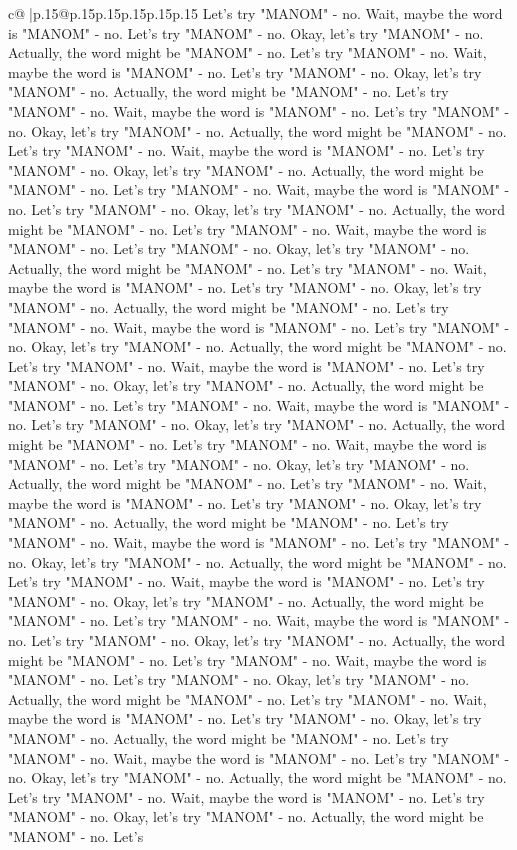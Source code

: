 \documentclass{article}
\begin{document}
{\begin{supertabular}{c@{$\;$}|p{.15\linewidth}@{}p{.15\linewidth}p{.15\linewidth}p{.15\linewidth}p{.15\linewidth}p{.15\linewidth}}
{{{Let's try "MANOM" {-} no. Wait, maybe the word is "MANOM" {-} no. Let's try "MANOM" {-} no. Okay, let's try "MANOM" {-} no. Actually, the word might be "MANOM" {-} no. Let's try "MANOM" {-} no. Wait, maybe the word is "MANOM" {-} no. Let's try "MANOM" {-} no. Okay, let's try "MANOM" {-} no. Actually, the word might be "MANOM" {-} no. Let's try "MANOM" {-} no. Wait, maybe the word is "MANOM" {-} no. Let's try "MANOM" {-} no. Okay, let's try "MANOM" {-} no. Actually, the word might be "MANOM" {-} no. Let's try "MANOM" {-} no. Wait, maybe the word is "MANOM" {-} no. Let's try "MANOM" {-} no. Okay, let's try "MANOM" {-} no. Actually, the word might be "MANOM" {-} no. Let's try "MANOM" {-} no. Wait, maybe the word is "MANOM" {-} no. Let's try "MANOM" {-} no. Okay, let's try "MANOM" {-} no. Actually, the word might be "MANOM" {-} no. Let's try "MANOM" {-} no. Wait, maybe the word is "MANOM" {-} no. Let's try "MANOM" {-} no. Okay, let's try "MANOM" {-} no. Actually, the word might be "MANOM" {-} no. Let's try "MANOM" {-} no. Wait, maybe the word is "MANOM" {-} no. Let's try "MANOM" {-} no. Okay, let's try "MANOM" {-} no. Actually, the word might be "MANOM" {-} no. Let's try "MANOM" {-} no. Wait, maybe the word is "MANOM" {-} no. Let's try "MANOM" {-} no. Okay, let's try "MANOM" {-} no. Actually, the word might be "MANOM" {-} no. Let's try "MANOM" {-} no. Wait, maybe the word is "MANOM" {-} no. Let's try "MANOM" {-} no. Okay, let's try "MANOM" {-} no. Actually, the word might be "MANOM" {-} no. Let's try "MANOM" {-} no. Wait, maybe the word is "MANOM" {-} no. Let's try "MANOM" {-} no. Okay, let's try "MANOM" {-} no. Actually, the word might be "MANOM" {-} no. Let's try "MANOM" {-} no. Wait, maybe the word is "MANOM" {-} no. Let's try "MANOM" {-} no. Okay, let's try "MANOM" {-} no. Actually, the word might be "MANOM" {-} no. Let's try "MANOM" {-} no. Wait, maybe the word is "MANOM" {-} no. Let's try "MANOM" {-} no. Okay, let's try "MANOM" {-} no. Actually, the word might be "MANOM" {-} no. Let's try "MANOM" {-} no. Wait, maybe the word is "MANOM" {-} no. Let's try "MANOM" {-} no. Okay, let's try "MANOM" {-} no. Actually, the word might be "MANOM" {-} no. Let's try "MANOM" {-} no. Wait, maybe the word is "MANOM" {-} no. Let's try "MANOM" {-} no. Okay, let's try "MANOM" {-} no. Actually, the word might be "MANOM" {-} no. Let's try "MANOM" {-} no. Wait, maybe the word is "MANOM" {-} no. Let's try "MANOM" {-} no. Okay, let's try "MANOM" {-} no. Actually, the word might be "MANOM" {-} no. Let's try "MANOM" {-} no. Wait, maybe the word is "MANOM" {-} no. Let's try "MANOM" {-} no. Okay, let's try "MANOM" {-} no. Actually, the word might be "MANOM" {-} no. Let's try "MANOM" {-} no. Wait, maybe the word is "MANOM" {-} no. Let's try "MANOM" {-} no. Okay, let's try "MANOM" {-} no. Actually, the word might be "MANOM" {-} no. Let's try "MANOM" {-} no. Wait, maybe the word is "MANOM" {-} no. Let's try "MANOM" {-} no. Okay, let's try "MANOM" {-} no. Actually, the word might be "MANOM" {-} no. Let's try "MANOM" {-} no. Wait, maybe the word is "MANOM" {-} no. Let's try "MANOM" {-} no. Okay, let's try "MANOM" {-} no. Actually, the word might be "MANOM" {-} no. Let's }}}
\end{supertabular}}
\end{document}

